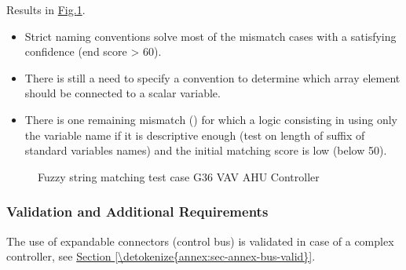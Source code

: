 \documentclass[letterpaper,10pt, openany,english]{sphinxmanual}
\begin{document}
Results in \hyperref[\detokenize{requirements:fig-string-match}]{Fig.\@ \ref{\detokenize{requirements:fig-string-match}}}.
\begin{itemize}
\item {} 
Strict naming conventions solve most of the mismatch cases with a satisfying confidence (end score \textgreater{} 60).

\item {} 
There is still a need to specify a convention to determine which array element should be connected to a scalar variable.

\item {} 
There is one remaining mismatch () for which a logic consisting in using only the variable name if it is descriptive enough (test on length of suffix of standard variables names) and the initial matching score is low (below 50).

\end{itemize}





\begin{figure}[htbp]
\centering
\capstart

\noindent{}
\caption{Fuzzy string matching test case \textendash{} G36 VAV AHU Controller}\label{\detokenize{requirements:fig-string-match}}\end{figure}


\subsubsection{Validation and Additional Requirements}
\label{\detokenize{requirements:validation-and-additional-requirements}}
The use of expandable connectors (control bus) is validated in case of a complex controller, see \hyperref[\detokenize{annex:sec-annex-bus-valid}]{Section \ref{\detokenize{annex:sec-annex-bus-valid}}}.
\end{document}
